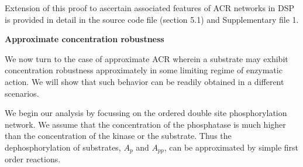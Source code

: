 \documentclass[9pt,lineno]{elife}
\begin{document}
\begin{appendixbox}
Extension of this proof to ascertain associated features of ACR networks in DSP is provided in detail in the source code file (section 5.1) and Supplementary file 1.




\textbf{Approximate concentration robustness}

We now turn to the case of approximate ACR wherein a substrate may exhibit concentration robustness approximately in some limiting regime of enzymatic action. We will show that such behavior can be readily obtained in a different scenarios. 

We begin our analysis by focussing on the ordered double site phosphorylation network. We assume that the concentration of the phosphatase is much higher than the concentration of the kinase or the substrate. Thus the dephosphorylation of substrates, $A_p$ and $A_{pp}$, can be approximated by simple first order reactions. 




\end{appendixbox}
\end{document}
